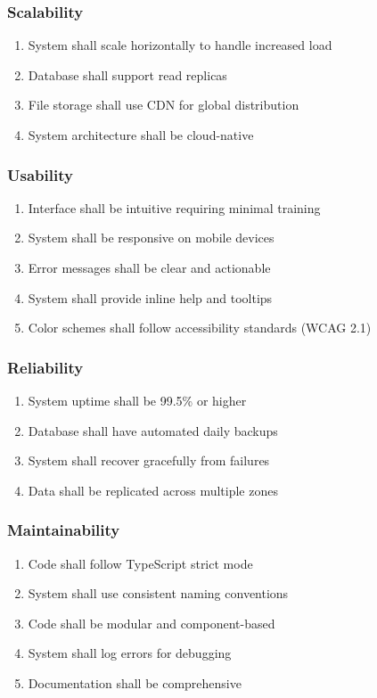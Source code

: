 \subsubsection{Scalability}
\begin{enumerate}[label=NFR-SCAL-\arabic*]
\item System shall scale horizontally to handle increased load
\item Database shall support read replicas
\item File storage shall use CDN for global distribution
\item System architecture shall be cloud-native
\end{enumerate}

\subsubsection{Usability}
\begin{enumerate}[label=NFR-USE-\arabic*]
\item Interface shall be intuitive requiring minimal training
\item System shall be responsive on mobile devices
\item Error messages shall be clear and actionable
\item System shall provide inline help and tooltips
\item Color schemes shall follow accessibility standards (WCAG 2.1)
\end{enumerate}

\subsubsection{Reliability}
\begin{enumerate}[label=NFR-REL-\arabic*]
\item System uptime shall be 99.5\% or higher
\item Database shall have automated daily backups
\item System shall recover gracefully from failures
\item Data shall be replicated across multiple zones
\end{enumerate}

\subsubsection{Maintainability}
\begin{enumerate}[label=NFR-MAIN-\arabic*]
\item Code shall follow TypeScript strict mode
\item System shall use consistent naming conventions
\item Code shall be modular and component-based
\item System shall log errors for debugging
\item Documentation shall be comprehensive
\end{enumerate}

